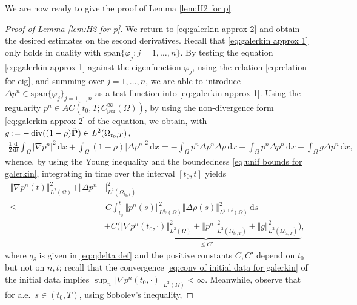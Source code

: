 \documentclass[11pt,a4paper,reqno]{amsart}
\theoremstyle{remark}
\theoremstyle{definition}
\numberwithin{equation}{section}
\newcommand{\per}{\mathrm{per}}
\DeclareMathOperator{\dv}{div}
\renewcommand{\P}{{\bf P}}
\renewcommand{\d}{\, \mathrm{d} }
\newcommand{\der}{\mathrm{d}}
\begin{document}
We are now ready to give the proof of Lemma \ref{lem:H2 for p}. 

\begin{proof}[Proof of Lemma \ref{lem:H2 for p}]
We return to \eqref{eq:galerkin approx 2} and obtain the desired estimates on the second derivatives. Recall that \eqref{eq:galerkin approx 1} only holds in duality with $\mathrm{span}\{\varphi_j:j=1,\dots,n\}$. By testing the equation \eqref{eq:galerkin approx 1} against the eigenfunction $\varphi_j$, using the relation \eqref{eq:relation for eig}, and summing over $j=1,\dots,n$, we are able to introduce $\Delta p^n \in \mathrm{span}\{\varphi_j\}_{j=1,\dots,n}$ as a test function into \eqref{eq:galerkin approx 1}. Using the regularity $p^n \in AC(t_0,T;C^\infty_\per(\Omega))$, by using the non-divergence form \eqref{eq:galerkin approx 2} of the equation, we obtain, with $g := - \dv((1-\rho)\tilde{\P}) \in L^2(\Omega_{t_0,T})$, 
\begin{equation*}
    \begin{aligned}
        \frac{1}{2}\frac{\der}{\der t}\int_\Omega |\nabla p^n|^2  \d x \!+\! \int_\Omega (1-\rho) |\Delta p^n|^2 \d x = -\!\int_\Omega p^n \Delta p^n \Delta \rho \d x \! +\!\int_\Omega p^n \Delta p^n \d x \!+\! \int_\Omega g \Delta p^n \d x, 
    \end{aligned}
\end{equation*}
whence, by using the Young inequality and the boundedness \eqref{eq:unif bounds for galerkin}, integrating in time over the interval $[t_0,t]$ yields 
\begin{equation}\label{eq:first step H2 p bound}
    \begin{aligned}
       \Vert \nabla p^n(t)\Vert_{L^2(\Omega)}^2 + \Vert \Delta p^n & \Vert_{L^2(\Omega_{t_0,t})}^2 \\ 
       \leq & \,  C\!\int_{t_0}^t\Vert p^n(s) \Vert_{L^{q_\delta}(\Omega)}^2 \Vert \Delta \rho(s) \Vert_{L^{2+\delta}(\Omega)}^{2} \d s \\ 
       &+ \underbrace{C \Big(\Vert \nabla p^n(t_0,\cdot) \Vert_{L^2(\Omega)}^2 \!+\! \Vert p^n \Vert^2_{L^2(\Omega_{t_0,T})} \!+\! \Vert g\Vert^2_{L^2(\Omega_{t_0,T})}\Big)}_{\leq C'}, 
    \end{aligned}
\end{equation}
where $q_\delta$ is given in \eqref{eq:qdelta def} and the positive constants $C,C'$ depend on $t_0$ but not on $n,t$; recall that the convergence \eqref{eq:conv of initial data for galerkin} of the initial data implies $\sup_n \Vert \nabla p^n(t_0,\cdot) \Vert_{L^2(\Omega)} < \infty$. Meanwhile, observe that for a.e.~$s \in (t_0,T)$, using Sobolev's inequality, 

\end{proof}
\end{document}
